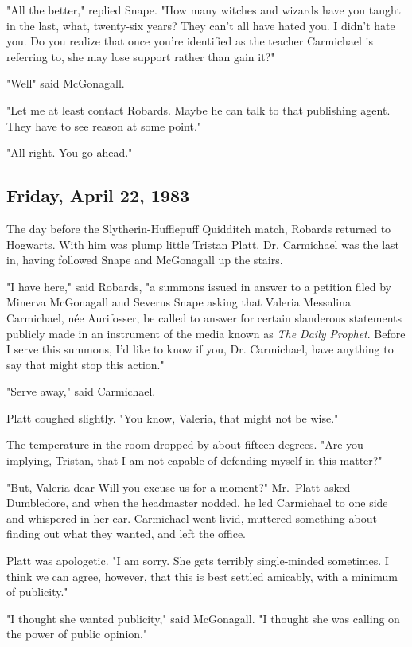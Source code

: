 "All the better," replied Snape. "How many witches and wizards have you taught in the last, what, twenty-six years? They can't all have hated you. I didn't hate you. Do you realize that once you're identified as the teacher Carmichael is referring to, she may lose support rather than gain it?"

"Well{\el}" said McGonagall.

"Let me at least contact Robards. Maybe he can talk to that publishing agent. They have to see reason at some point."

"All right. You go ahead."

\subsection{Friday, April 22, 1983}

The day before the Slytherin-Hufflepuff Quidditch match, Robards returned to Hogwarts. With him was plump little Tristan Platt. Dr. Carmichael was the last in, having followed Snape and McGonagall up the stairs.

"I have here," said Robards, "a summons issued in answer to a petition filed by Minerva McGonagall and Severus Snape asking that Valeria Messalina Carmichael, née Aurifosser, be called to answer for certain slanderous statements publicly made in an instrument of the media known as \emph{The Daily Prophet}. Before I serve this summons, I'd like to know if you, Dr. Carmichael, have anything to say that might stop this action."

"Serve away," said Carmichael.

Platt coughed slightly. "You know, Valeria, that might not be wise."

The temperature in the room dropped by about fifteen degrees. "Are you implying, Tristan, that I am not capable of defending myself in this matter?"

"But, Valeria dear{\el} Will you excuse us for a moment?" Mr.~Platt asked Dumbledore, and when the headmaster nodded, he led Carmichael to one side and whispered in her ear. Carmichael went livid, muttered something about finding out what they wanted, and left the office.

Platt was apologetic. "I am sorry. She gets terribly single-minded sometimes. I think we can agree, however, that this is best settled amicably, with a minimum of publicity."

"I thought she wanted publicity," said McGonagall. "I thought she was calling on the power of public opinion."

